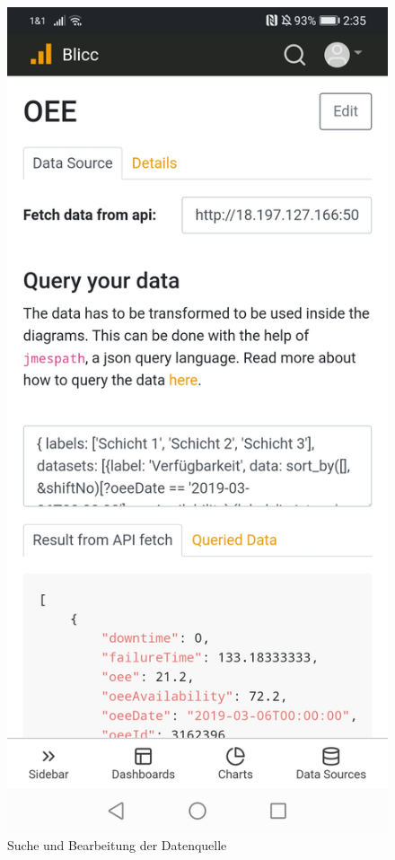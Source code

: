 \begin{figure}[h]
    \includegraphics[scale=0.1]{img/android/DataSource}
    \caption{Suche und Bearbeitung der Datenquelle}
    \label{figure:sucheundbearbeitungderdatenquelle}
\end{figure}


